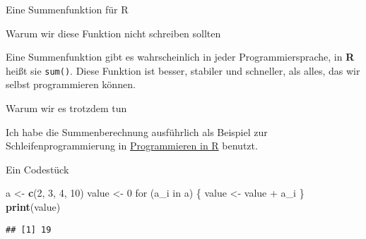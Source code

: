 \documentclass[compress]{beamer}
\newenvironment{Shaded}{}{}
\newcommand{\KeywordTok}[1]{\textcolor[rgb]{0.00,0.44,0.13}{\textbf{{#1}}}}
\newcommand{\DecValTok}[1]{\textcolor[rgb]{0.25,0.63,0.44}{{#1}}}
\newcommand{\StringTok}[1]{\textcolor[rgb]{0.25,0.44,0.63}{{#1}}}
\newcommand{\NormalTok}[1]{{#1}}
\begin{document}
\begin{frame}[fragile]{Eine Summenfunktion für R}

\begin{block}{Warum wir diese Funktion nicht schreiben sollten}

Eine Summenfunktion gibt es wahrscheinlich in jeder Programmiersprache,
in \textbf{R} heißt sie \texttt{sum()}. Diese Funktion ist besser,
stabiler und schneller, als alles, das wir selbst programmieren können.

\end{block}

\begin{block}{Warum wir es trotzdem tun}

Ich habe die Summenberechnung ausführlich als Beispiel zur
Schleifenprogrammierung in
\href{https://fvafrcu.github.io/programmieren_in_r/\#gute-schleifen}{Programmieren
in R} benutzt.

\end{block}

\end{frame}

\begin{frame}[fragile]{Ein Codestück}

\begin{Shaded}
\begin{Highlighting}[]
\NormalTok{a  <-}\StringTok{ }\KeywordTok{c}\NormalTok{(}\DecValTok{2}\NormalTok{, }\DecValTok{3}\NormalTok{, }\DecValTok{4}\NormalTok{, }\DecValTok{10}\NormalTok{)}
\NormalTok{value <-}\StringTok{ }\DecValTok{0}
\NormalTok{for (a_i in a) \{}
    \NormalTok{value <-}\StringTok{ }\NormalTok{value +}\StringTok{ }\NormalTok{a_i }
\NormalTok{\}}
\KeywordTok{print}\NormalTok{(value)}
\end{Highlighting}
\end{Shaded}

\begin{verbatim}
## [1] 19
\end{verbatim}

\end{frame}
\end{document}

